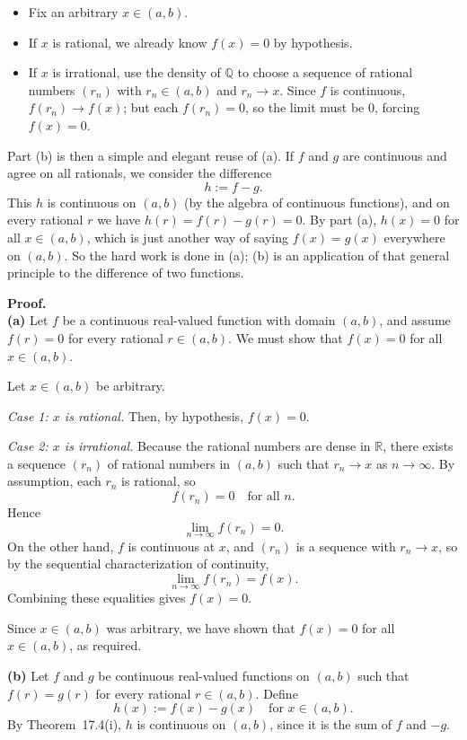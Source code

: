 \documentclass[12pt]{article}
\begin{document}
\begin{itemize}
  \item Fix an arbitrary $x \in (a,b)$.
  \item If $x$ is rational, we already know $f(x)=0$ by hypothesis.
  \item If $x$ is irrational, use the density of $\mathbb{Q}$ to choose a sequence
        of rational numbers $(r_n)$ with $r_n \in (a,b)$ and $r_n \to x$.
        Since $f$ is continuous, $f(r_n) \to f(x)$; but each $f(r_n)=0$, so the limit
        must be $0$, forcing $f(x)=0$.
\end{itemize}

Part (b) is then a simple and elegant reuse of (a).  If $f$ and $g$ are continuous
and agree on all rationals, we consider the difference
\[
  h := f-g.
\]
This $h$ is continuous on $(a,b)$ (by the algebra of continuous functions),
and on every rational $r$ we have $h(r) = f(r)-g(r) = 0$.  By part (a), $h(x)=0$
for all $x \in (a,b)$, which is just another way of saying $f(x)=g(x)$ everywhere
on $(a,b)$.  So the hard work is done in (a); (b) is an application of that general
principle to the difference of two functions.

\vspace{0.25em}
\textbf{Proof.} \\[0.25em]
\textbf{(a)}  
Let $f$ be a continuous real-valued function with domain $(a,b)$, and assume
$f(r)=0$ for every rational $r \in (a,b)$.  We must show that $f(x)=0$ for all
$x \in (a,b)$.

Let $x \in (a,b)$ be arbitrary.

\emph{Case 1: $x$ is rational.}  
Then, by hypothesis, $f(x)=0$.

\emph{Case 2: $x$ is irrational.}  
Because the rational numbers are dense in $\mathbb{R}$, there exists a sequence
$(r_n)$ of rational numbers in $(a,b)$ such that $r_n \to x$ as $n\to\infty$.
By assumption, each $r_n$ is rational, so
\[
  f(r_n) = 0 \quad\text{for all } n.
\]
Hence
\[
  \lim_{n\to\infty} f(r_n) = 0.
\]
On the other hand, $f$ is continuous at $x$, and $(r_n)$ is a sequence with
$r_n \to x$, so by the sequential characterization of continuity,
\[
  \lim_{n\to\infty} f(r_n) = f(x).
\]
Combining these equalities gives $f(x)=0$.

Since $x \in (a,b)$ was arbitrary, we have shown that $f(x)=0$ for all
$x \in (a,b)$, as required.

\bigskip
\textbf{(b)}  
Let $f$ and $g$ be continuous real-valued functions on $(a,b)$ such that
$f(r)=g(r)$ for every rational $r \in (a,b)$.  Define
\[
  h(x) := f(x) - g(x)\quad\text{for } x \in (a,b).
\]
By Theorem~17.4(i), $h$ is continuous on $(a,b)$, since it is the sum of $f$
and $-g$.
\end{document}
